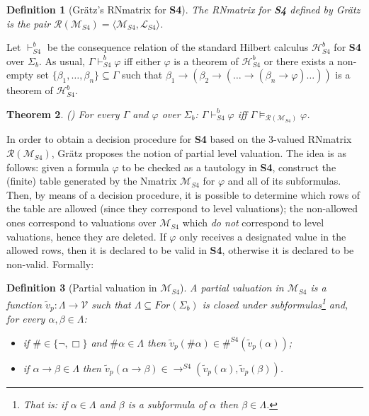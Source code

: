 \documentclass[12pt]{article}
\newtheorem{theorem}{Theorem}[section]
\newtheorem{definition}[theorem]{Definition}
\begin{document}
\begin{definition}[Gr\"atz's RNmatrix for \textbf{S4}]\label{def:gratz_Rnmatrix_s4}
    The RNmatrix for \textbf{S4} defined by Gr\"atz is the pair $\mathcal{R}(\mathcal{M}_{S4}) = \langle \mathcal{M}_{S4}, \mathcal{L}_{S4}\rangle$.
\end{definition}

Let $\vdash_{S4}^b$ be the consequence relation of the standard Hilbert calculus $\mathcal{H}^b_{S4}$ for \textbf{S4} over $\Sigma_b$. As usual, $\Gamma \vdash_{S4}^b \varphi$ iff either $\varphi$ is a theorem of $\mathcal{H}^b_{S4}$ or there exists a non-empty set $\{\beta_1,\ldots,\beta_n\} \subseteq \Gamma$ such that $\beta_1 \to (\beta_2 \to(\ldots \to(\beta_n \to \varphi) \ldots))$ is a theorem of $\mathcal{H}^b_{S4}$.

\begin{theorem} {\em(\cite[Theorems~3.5 and~3.10]{gratz_truth_2022})} \label{Theor:sound_compl_S4}  For every $\Gamma$ and $\varphi$ over $\Sigma_{b}$: $\Gamma \vdash_{S4}^b \varphi$ iff $\Gamma  \models_{\mathcal{R}(\mathcal{M}_{S4})} \varphi$.
\end{theorem}

In order to obtain a decision procedure for \textbf{S4} based on the $3$-valued RNmatrix $\mathcal{R}(\mathcal{M}_{S4})$, Gr\"atz proposes the notion of partial level valuation. The idea is as follows: given a formula $\varphi$ to be checked as a tautology in \textbf{S4}, construct the (finite) table generated by the Nmatrix $\mathcal{M}_{S4}$ for $\varphi$ and all of its subformulas. Then, by means of a decision procedure, it is possible to determine which rows of the table are allowed (since they correspond to level valuations); the non-allowed ones correspond to valuations over $\mathcal{M}_{S4}$ which {\em do not} correspond to level valuations, hence they are deleted. If $\varphi$ only receives a designated value in the allowed rows, then it is declared to be valid in \textbf{S4}, otherwise it is declared to be non-valid. Formally:

\begin{definition}[Partial valuation  in $\mathcal{M}_{S4}$]\label{def:partial_valuation0}
A partial valuation in $\mathcal{M}_{S4}$ is a function $\tilde v_p :\Lambda \rightarrow \mathcal{V}$ such that  $\Lambda \subseteq For(\Sigma_b)$ is  closed under subformulas\footnote{That is: if $\alpha \in \Lambda$ and $\beta$ is  a subformula of $\alpha$ then $\beta \in \Lambda$.} and, for every $\alpha,\beta \in \Lambda$:
 
 \begin{itemize}
 \item[--] if $\# \in \{\neg,\Box\}$ and  $\#\alpha \in \Lambda$ then $\tilde v_p(\#\alpha) \in \#^{S4}(\tilde v_p(\alpha))$;
 \item[--] if  $\alpha \to \beta\in\Lambda$ then  $\tilde v_p(\alpha \to \beta) \in {\to}^{S4}(\tilde v_p(\alpha),\tilde v_p(\beta))$.
 \end{itemize}
\end{definition}
\end{document}
